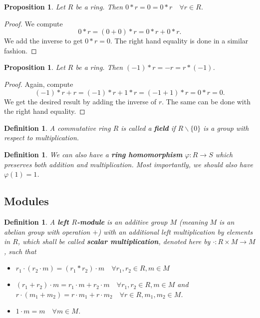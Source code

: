 \documentclass{article}
\theoremstyle{norm}
\newtheorem{df}[thm]{Definition}
\newtheorem{prop}[thm]{Proposition}
\begin{document}
\begin{prop}
Let $R$ be a ring. Then $0 * r = 0 = 0 * r \quad \forall r \in R$.
\end{prop}
\begin{proof}
We compute
\[ 0 * r = \left(0 + 0\right) * r = 0 * r + 0 * r. \]
We add the inverse to get $0 * r = 0$. The right hand equality is done
in a similar fashion.
\end{proof}

\begin{prop}
Let $R$ be a ring. Then $\left(-1\right) * r = -r = r * \left(-1\right)$.
\end{prop}
\begin{proof}
Again, compute
\[ \left(-1\right) * r + r = \left(-1\right) * r + 1 * r = \left(-1 +
1\right) * r = 0 * r = 0. \]
We get the desired result by adding the inverse of $r$. The same can be
done with the right hand equality.
\end{proof}

\begin{df}
A commutative ring $R$ is called a \textbf{field} if $R \backslash \lbrace 0
\rbrace $ is a group with respect to multiplication.
\end{df}

\begin{df}
We can also have a \textbf{ring homomorphism} $\varphi : R \rightarrow
S$ which preserves both addition and multiplication. Most importantly,
we should also have $\varphi(1) = 1$.
\end{df}

\subsection{Modules}
\begin{df}
A \textbf{left $R$-module} is an additive group $M$ (meaning $M$ is an
abelian group with operation $+$) with an additional left multiplication
by elements in $R$, which shall be called \textbf{scalar
multiplication}, denoted here by $\cdot : R \times M \rightarrow M$,
such that
\begin{itemize}
\item $r_1 \cdot \left(r_2 \cdot m\right) = \left(r_1 * r_2\right) \cdot
m \quad \forall r_1, r_2 \in R, m \in M$
\item $\left(r_1 + r_2\right) \cdot m = r_1 \cdot m + r_2 \cdot m \quad
\forall r_1, r_2 \in R, m \in M$ and $r \cdot \left(m_1 + m_2\right) = r
\cdot m_1 + r \cdot m_2 \quad \forall r \in R, m_1, m_2 \in M$.
\item $1 \cdot m = m \quad \forall m \in M$.
\end{itemize}
\end{df}
\end{document}
